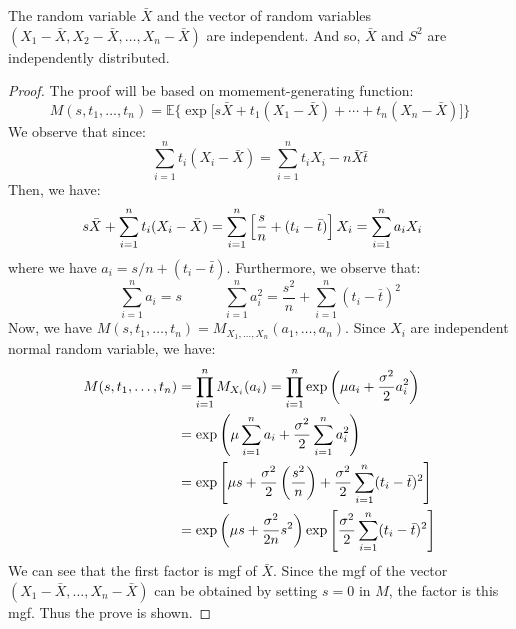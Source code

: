 \begin{theorem}
    The random variable $\bar{X}$ and the vector of random variables $(X_1-\bar{X}, X_2-\bar{X}, \dots, X_n-\bar{X})$ are independent. And so, $\bar{X}$ and $S^2$ are independently distributed. 
\end{theorem}
\begin{proof}
    The proof will be based on momement-generating function:
    \begin{equation*}
        M(s, t_1,\dots,t_n) = \mathbb{E}\Big\{ \exp\Big[ s\bar{X} + t_1(X_1 - \bar{X}) + \cdots + t_n(X_n-\bar{X}) \Big] \Big\}
    \end{equation*}
    We observe that since:
    \begin{equation*}
        \sum^n_{i=1}t_i(X_i - \bar{X}) = \sum^n_{i=1}t_iX_i - n\bar{X}\bar{t}
    \end{equation*}
    Then, we have:
    \begin{equation*}
    \begin{aligned}
        s\bar{X} + \sum^n_{i=1}t_i(X_i - \bar{X}) &= \sum^n_{i=1}\left[ \frac{s}{n} + (t_i - \bar{t}) \right]X_i = \sum^n_{i=1}a_iX_i
    \end{aligned}
    \end{equation*}
    where we have $a_i = s/n + (t_i - \bar{t})$. Furthermore, we observe that:
    \begin{equation*}
        \sum^n_{i=1}a_i = s \qquad\quad \sum^n_{i=1} a^2_i = \frac{s^2}{n} + \sum^n_{i=1}(t_i-\bar{t})^2
    \end{equation*}
    Now, we have $M(s, t_1,\dots,t_n) = M_{X_1,\dots,X_n}(a_1,\dots,a_n)$. Since $X_i$ are independent normal random variable, we have:
    \begin{equation*}
    \begin{aligned}
        M(s, t_1,\dots,t_n) &= \prod^n_{i=1}M_{X_i}(a_i) = \prod^n_{i=1}\exp\left( \mu a_i + \frac{\sigma^2}{2}a_i^2 \right) \\
        &= \exp\left( \mu\sum^n_{i=1}a_i + \frac{\sigma^2}{2}\sum^n_{i=1}a_i^2 \right) \\
        &= \exp\left[ \mu s + \frac{\sigma^2}{2}\left( \frac{s^2}{n} \right) + \frac{\sigma^2}{2}\sum^n_{i=1}(t_i - \bar{t})^2 \right] \\
        &= \exp\left( \mu s + \frac{\sigma^2}{2n}s^2 \right)\exp\left[ \frac{\sigma^2}{2}\sum^n_{i=1}(t_i - \bar{t})^2 \right]
    \end{aligned}
    \end{equation*}
    We can see that the first factor is mgf of $\bar{X}$. Since the mgf of the vector $(X_1-\bar{X}, \dots,X_n-\bar{X})$ can be obtained by setting $s = 0$ in $M$, the factor is this mgf. Thus the prove is shown.
\end{proof}

